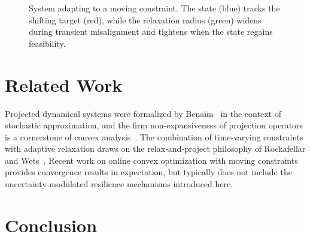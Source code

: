 \documentclass{article}
\begin{document}
\begin{figure}[htbp]
\centering
{}
\caption{System adapting to a moving constraint. The state (blue) tracks the shifting target (red), while the relaxation radius (green) widens during transient misalignment and tightens when the state regains feasibility.}
\label{fig:traj}
\end{figure}

\section{Related Work}
\label{sec:related}

Projected dynamical systems were formalized by Bena\"im~\cite{benaim1999} in the context of stochastic approximation, and the firm non‑expansiveness of projection operators is a cornerstone of convex analysis~\cite{bauschke2011convex}. The combination of time‑varying constraints with adaptive relaxation draws on the relax‑and‑project philosophy of Rockafellar and Wets~\cite{rockafellar2009}. Recent work on online convex optimization with moving constraints~\cite{kushner2003} provides convergence results in expectation, but typically does not include the uncertainty‑modulated resilience mechanisms introduced here.

\section{Conclusion}
\label{sec:conclusion}
\end{document}
